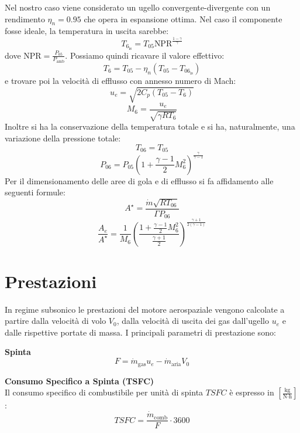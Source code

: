 Nel nostro caso viene considerato un ugello convergente-divergente con un rendimento \(\eta_{n}=0.95\) che opera in espansione ottima.
Nel caso il componente fosse ideale, la temperatura in uscita sarebbe:
\begin{equation*}
    T_{6_{\text{is}}} = T_{05} \text{NPR}^{\frac{1-\gamma}{\gamma}}
\end{equation*}
dove \(\text{NPR} = \frac{P_{05}}{P_{\text{amb}}}\).
Possiamo quindi ricavare il valore effettivo:
\begin{equation*}
    T_{6} = T_{05} - \eta_{n}(T_{05} - T_{06_{\text{is}}})
\end{equation*}
e trovare poi la velocità di efflusso con annesso numero di Mach:
\begin{equation*}
    u_{e} = \sqrt{2C_{p}(T_{05} - T_{6})}
\end{equation*}
\begin{equation*}
    M_{6} =\frac{u_{e}} {\sqrt{\gamma R T_{6}}}
\end{equation*}
Inoltre si ha la conservazione della temperatura totale e si ha, naturalmente, una variazione della pressione totale:
\begin{equation*}
    T_{06} =T_{05}
\end{equation*}
\begin{equation*}
    P_{06}=P_{05}(1 + \frac{\gamma-1}{2}M_{6}^2)^\frac{\gamma}{\gamma-1}
\end{equation*}
Per il dimensionamento delle aree di gola e di efflusso si fa affidamento alle seguenti formule:
\[ A^{\star}=\frac{\dot{m}\sqrt{RT_{06}}}{\Gamma P_{06}} \]
\[\frac{A_e}{A^{\star}}=\frac{1}{M_6} \left( \frac{1+\frac{\gamma-1}{2}M_6^{2}}{\frac{\gamma+1}{2}} \right)^{\frac{\gamma+1}{2(\gamma-1)}}\]


\section{Prestazioni}
\label{appB:prestazioni}
In regime subsonico le prestazioni del motore aerospaziale vengono calcolate a partire dalla velocità di volo $V_0$, dalla velocità di uscita dei gas dall'ugello $u_e$ e dalle rispettive portate di massa. I principali parametri di prestazione sono:

\textbf{Spinta} \\
\begin{equation*}
    F = \dot{m}_{\text{gas}} u_e - \dot{m}_{\text{aria}} V_0
\end{equation*}

\textbf{Consumo Specifico a Spinta (TSFC)} \\
Il consumo specifico di combustibile per unità di spinta $TSFC$ è espresso in $\left[\frac{\text{kg}}{\text{N} \cdot \text{h}}\right]$:
\begin{equation*}
    TSFC = \frac{\dot{m}_{\text{comb}}}{F} \cdot 3600
\end{equation*}

